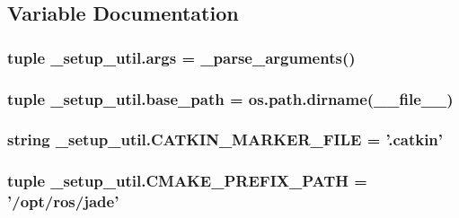 \subsection{Variable Documentation}
\hypertarget{namespace__setup__util_ac67cb2d93e0636936bcbeb363e2c87c3}{
\subsubsection[{args}]{\setlength{\rightskip}{0pt plus 5cm}tuple \-\_\-setup\-\_\-util.\-args = {\bf \-\_\-parse\-\_\-arguments}()}}\label{namespace__setup__util_ac67cb2d93e0636936bcbeb363e2c87c3}
\hypertarget{namespace__setup__util_aecc545d18611814ee5d7ccdf6aa55f90}{
\subsubsection[{base\-\_\-path}]{\setlength{\rightskip}{0pt plus 5cm}tuple \-\_\-setup\-\_\-util.\-base\-\_\-path = os.\-path.\-dirname(\-\_\-\-\_\-file\-\_\-\-\_\-)}}\label{namespace__setup__util_aecc545d18611814ee5d7ccdf6aa55f90}
\hypertarget{namespace__setup__util_a3fa0ca5a460a71a43cbc3d4954ab1f10}{
\subsubsection[{C\-A\-T\-K\-I\-N\-\_\-\-M\-A\-R\-K\-E\-R\-\_\-\-F\-I\-L\-E}]{\setlength{\rightskip}{0pt plus 5cm}string \-\_\-setup\-\_\-util.\-C\-A\-T\-K\-I\-N\-\_\-\-M\-A\-R\-K\-E\-R\-\_\-\-F\-I\-L\-E = '.catkin'}}\label{namespace__setup__util_a3fa0ca5a460a71a43cbc3d4954ab1f10}
\hypertarget{namespace__setup__util_a44bed5f85daa4641b3c144edb9e8c1c1}{
\subsubsection[{C\-M\-A\-K\-E\-\_\-\-P\-R\-E\-F\-I\-X\-\_\-\-P\-A\-T\-H}]{\setlength{\rightskip}{0pt plus 5cm}tuple \-\_\-setup\-\_\-util.\-C\-M\-A\-K\-E\-\_\-\-P\-R\-E\-F\-I\-X\-\_\-\-P\-A\-T\-H = '/opt/ros/jade'}}\label{namespace__setup__util_a44bed5f85daa4641b3c144edb9e8c1c1}

